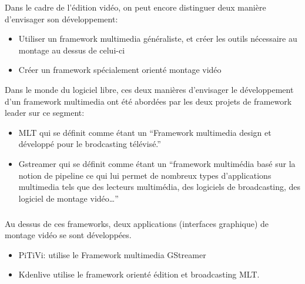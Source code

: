 Dans le cadre de l'édition vidéo, on peut encore distinguer deux manière
d'envisager son développement:

\begin {itemize}

  \item {Utiliser un framework multimedia généraliste, et créer les
  outils nécessaire
         au montage au dessus de celui-ci} %

  \item {Créer un framework spécialement orienté montage vidéo}

\end {itemize}

Dans le monde du logiciel libre, ces deux manières d'envisager le
développement d'un framework multimedia ont été abordées par les deux
projets de framework leader sur ce segment:

\begin {itemize}

  \item {MLT qui se définit comme étant un ``Framework multimedia design
    et développé pour le brodcasting télévisé.''}

  \item {Gstreamer qui se définit comme étant un ``framework multimédia
    basé sur la notion de pipeline ce qui lui permet de nombreux types
    d'applications multimedia tels que des lecteurs multimédia, des
    logiciels de broadcasting, des logiciel de montage vidéo\ldots''}

\end {itemize}

\subparagraph {}

Au dessus de ces frameworks, deux applications (interfaces graphique)
de montage vidéo se sont développées.

\begin {itemize}

  \item {PiTiVi: utilise le Framework multimedia GStreamer}

  \item {Kdenlive utilise le framework orienté édition et
    broadcasting MLT.}

\end {itemize}

\paragraph {}

